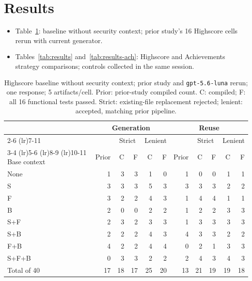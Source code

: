 \section{Results}
\label{sec:results}

\begin{itemize}
\item Table~\ref{tab:matrix}: baseline without security context;
prior study's 16 Highscore cells rerun with current generator.
\item Tables~\ref{tab:results} and~\ref{tab:results-ach}: Highscore and
Achievements strategy comparisons; controls collected in the same session.
\end{itemize}

\begin{table}[t]
\centering
\footnotesize
\setlength{\tabcolsep}{4pt}
\caption{Highscore baseline without security context; prior study and \texttt{gpt-5.6-luna} rerun; one response; 5 artifacts/cell. Prior: prior-study compiled count. C: compiled; F: all 16 functional tests passed. Strict: existing-file replacement rejected; lenient: accepted, matching prior pipeline.}
\label{tab:matrix}
\begin{tabular}{@{}lrrrrrrrrrr@{}}
\toprule
 & \multicolumn{5}{c}{Generation} & \multicolumn{5}{c}{Reuse} \\
\cmidrule(lr){2-6} \cmidrule(lr){7-11}
 & & \multicolumn{2}{c}{Strict} & \multicolumn{2}{c}{Lenient} & & \multicolumn{2}{c}{Strict} & \multicolumn{2}{c}{Lenient} \\
\cmidrule(lr){3-4} \cmidrule(lr){5-6} \cmidrule(lr){8-9} \cmidrule(lr){10-11}
Base context & Prior & C & F & C & F & Prior & C & F & C & F \\
\midrule
None & 1 & 3 & 3 & 1 & 0 & 1 & 0 & 0 & 1 & 1 \\
S & 3 & 3 & 3 & 5 & 3 & 3 & 3 & 3 & 2 & 2 \\
F & 3 & 2 & 2 & 4 & 3 & 1 & 4 & 4 & 1 & 1 \\
B & 2 & 0 & 0 & 2 & 2 & 1 & 2 & 2 & 3 & 3 \\
S+F & 2 & 3 & 2 & 3 & 3 & 1 & 3 & 3 & 3 & 3 \\
S+B & 2 & 2 & 2 & 4 & 3 & 4 & 3 & 3 & 2 & 2 \\
F+B & 4 & 2 & 2 & 4 & 4 & 0 & 2 & 1 & 3 & 3 \\
S+F+B & 0 & 3 & 3 & 2 & 2 & 2 & 4 & 3 & 4 & 3 \\
Total of 40 & 17 & 18 & 17 & 25 & 20 & 13 & 21 & 19 & 19 & 18 \\
\bottomrule
\end{tabular}
\end{table}

